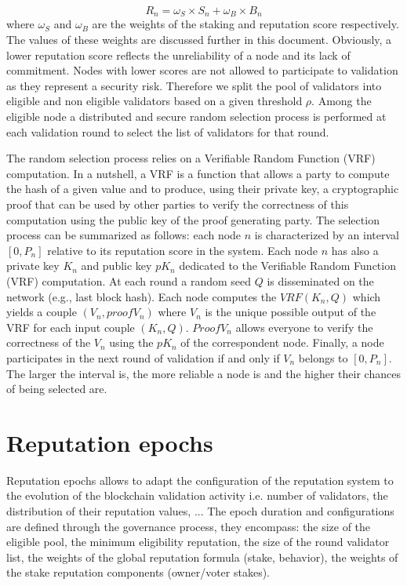 \documentclass[]{article}
\begin{document}
\begin{equation}
\label{eq:aggregation}
    R_n = \omega_S \times S_n + \omega_B \times B_n
\end{equation}
where $\omega_S$ and $\omega_B$ are the weights of the staking and reputation score respectively. The values of these weights are discussed further in this document. Obviously, a lower reputation score reflects the unreliability of a node and its lack of commitment. Nodes with lower scores are not allowed to participate to validation as they represent a security risk. Therefore we split the pool of validators into eligible and non eligible validators based on a given threshold $\rho$. Among the eligible node a distributed and secure random selection process is performed at each validation round to select the list of validators for that round. 

The random selection process relies on a Verifiable Random Function (VRF) computation. In a nutshell, a VRF \cite{micali1999verifiable,dodis2005verifiable} is a function that allows a party to compute the hash of a given value and to produce, using their private key, a cryptographic proof that can be used by other parties to verify the correctness of this computation using the public key of the proof generating party. The selection process can be summarized as follows: each node $n$ is characterized by an interval $[0, P_n]$ relative to its reputation score in the system. Each node $n$ has also a private key $K_n$ and public key $pK_n$ dedicated to the Verifiable Random Function (VRF) computation. At each round a random seed $Q$ is disseminated on the network (e.g., last block hash). Each node computes the $VRF(K_n, Q)$ which yields a couple $(V_n, proofV_n)$ where $V_n$ is the unique possible output of the VRF for each input couple $(K_n, Q)$. $ProofV_n$ allows everyone to verify the correctness of the $V_n$ using the $pK_n$ of the correspondent node. Finally, a node participates in the next round of validation if and only if $V_n$ belongs to $[0, P_n]$. The larger the interval is, the more reliable a node is and the higher their chances of being selected are. 

\section{Reputation epochs}
\label{sec:epochs}
Reputation epochs allows to adapt the configuration of the reputation system to the evolution of the blockchain validation activity i.e. number of validators, the distribution of their reputation values, ... The epoch duration and configurations are defined through the governance process, they encompass: the size of the eligible pool, the minimum eligibility reputation, the size of the round validator list, the weights of the global reputation formula (stake, behavior), the weights of the stake reputation components (owner/voter stakes).
\end{document}
